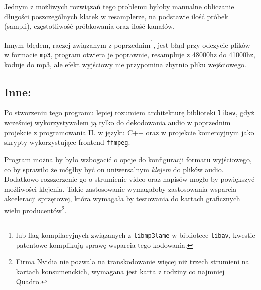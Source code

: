 \documentclass[a4paper,12pt]{article}
\begin{document}
Jednym z możliwych rozwiązań tego problemu byłoby manualne obliczanie długości
poszczególnych klatek w resamplerze, na podstawie ilość próbek (sampli),
częstotliwość próbkowania oraz ilość kanałów.

Innym błędem, raczej związanym z poprzednim\footnote{lub flag kompilacyjnych
związanych z \texttt{libmp3lame} w bibliotece \texttt{libav}, kwestie patentowe
komplikują sprawę wsparcia tego kodowania.}, jest błąd przy odczycie plików w
formacie \texttt{mp3}, program otwiera je poprawnie, resampluje z 48000hz do
41000hz, koduje do mp3, ale efekt wyjściowy nie przypomina zbytnio pliku
wejściowego.

\subsection*{Inne:}

Po stworzeniu tego programu lepiej rozumiem architekturę biblioteki
\texttt{libav}, gdyż wcześniej wykorzystywałem ją tylko do dekodowania audio w
poprzednim projekcie z
\href{https://github.com/HakierGrzonzo/GrzesSFMLlib}{programowania II.} w języku
C++ oraz w projekcie komercyjnym jako skrypty wykorzystujące frontend
\texttt{ffmpeg}. 

Program można by było wzbogacić o opcje do konfiguracji formatu wyjściowego, co
by sprawiło że mógłby być on uniwersalnym \emph{klejem} do plików audio.
Dodatkowo rozszerzenie go o strumienie video oraz napisów mogło by powiększyć
możliwości klejenia. Takie zastosowanie wymagałoby zastosowania wsparcia
akceleracji sprzętowej, która wymagała by testowania do kartach graficznych
wielu producentów\footnote{Firma Nvidia nie pozwala na transkodowanie więcej niż
trzech strumieni na kartach konsumenckich, wymagana jest karta z rodziny
co najmniej Quadro.}. 
\end{document}
